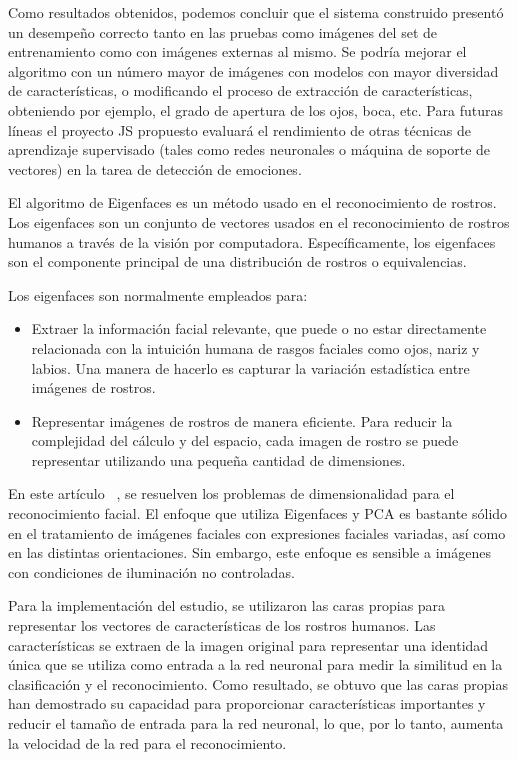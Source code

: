 Como resultados obtenidos, podemos concluir que el sistema construido presentó un desempeño correcto tanto en las pruebas como imágenes del set de entrenamiento como con imágenes externas al mismo. Se podría mejorar el algoritmo con un número mayor de imágenes con modelos con mayor diversidad de características, o modificando el proceso de extracción de características, obteniendo por ejemplo, el grado de apertura de los ojos, boca, etc. 
Para futuras líneas el proyecto JS propuesto evaluará el rendimiento de otras técnicas de aprendizaje supervisado (tales como redes neuronales o máquina de soporte de vectores) en la tarea de detección de emociones. 

El algoritmo de Eigenfaces es un método usado en el reconocimiento de rostros. Los eigenfaces son un conjunto de vectores usados en el reconocimiento de rostros humanos a través de la visión por computadora. Específicamente, los eigenfaces son el componente principal de una distribución de rostros o equivalencias.

Los eigenfaces son normalmente empleados para:

\begin{itemize}
\item Extraer la información facial relevante, que puede o no estar directamente relacionada con la intuición humana de rasgos faciales como ojos, nariz y labios. Una manera de hacerlo es capturar la variación estadística entre imágenes de rostros.
\item Representar imágenes de rostros de manera eficiente. Para reducir la complejidad del cálculo y del espacio, cada imagen de rostro se puede representar utilizando una pequeña cantidad de dimensiones.
\end{itemize}

En este artículo ~\cite{tesis}, se resuelven los problemas de dimensionalidad para el reconocimiento facial. El enfoque que utiliza Eigenfaces y PCA es bastante sólido en el tratamiento de imágenes faciales con expresiones faciales variadas, así como en las distintas orientaciones. Sin embargo, este enfoque es sensible a imágenes con condiciones de iluminación no controladas.

Para la implementación del estudio, se utilizaron las caras propias para representar los vectores de características de los rostros humanos. Las características se extraen de la imagen original para representar una identidad única que se utiliza como entrada a la red neuronal para medir la similitud en la clasificación y el reconocimiento. Como resultado, se obtuvo que las caras propias han demostrado su capacidad para proporcionar características importantes y reducir el tamaño de entrada para la red neuronal, lo que, por lo tanto, aumenta la velocidad de la red para el reconocimiento.

